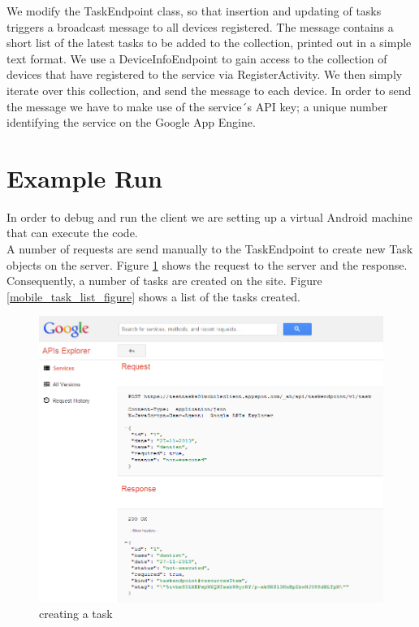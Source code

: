 We modify the TaskEndpoint class, so that insertion and updating of tasks triggers a broadcast message to all devices registered. The message contains a short list of the latest tasks to be added to the collection, printed out in a simple text format. We use a DeviceInfoEndpoint to gain access to the collection of devices that have registered to the service via RegisterActivity. We then simply iterate over this collection, and send the message to each device. In order to send the message we have to make use of the service´s API key; a unique number identifying the service on the Google App Engine. 


\section{Example Run}
In order to debug and run the client we are setting up a virtual Android machine that can execute the code.\\
A number of requests are send manually to the TaskEndpoint to create new Task objects on the server. Figure \ref{mobile_json_figure} shows the request to the server and the response. Consequently, a number of tasks are created on the site. Figure \ref{mobile_task_list_figure} shows a list of the tasks created.\\
\begin{figure}[ht]
	\centering
	\includegraphics[scale=0.7]{images/googlecloud__createtask.png}
	\caption{creating a task}
	\label{mobile_json_figure}
\end{figure}
